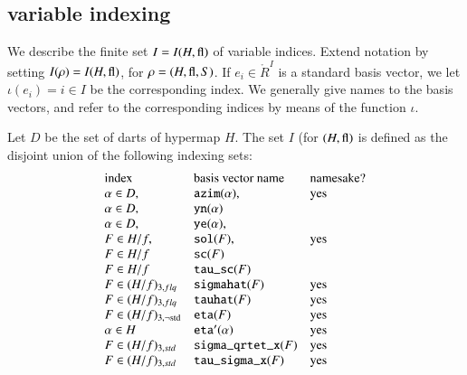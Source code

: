 \subsection{variable indexing}
\label{sec:var-index}

We describe the finite set $I = I(H,{\operatorname{fl}})$ of variable indices.
Extend notation by setting $I(\rho) = I(H,{\operatorname{fl}})$, for $\rho =
(H,{\operatorname{fl}},S)$.  If $e_i\in \ring{R}^I$ is a standard basis
vector, we let $\iota(e_i)=i\in I$ be the corresponding index.  We
generally give names to the basis vectors, and refer to the
corresponding indices by means of the function $\iota$.





\begin{definition}
Let $D$ be the set of darts of hypermap $H$.  The set $I$ (for
$(H,\op{fl})$ is defined as the disjoint union of the following
indexing sets:
    $$\begin{array}{llll}
        \text{index} &\text{basis vector name}&\text{namesake?}
        \\
        \alpha\in D, &\optt{azim}(\alpha), &\text{yes}
        \\
        \alpha\in D, &\optt{yn} (\alpha)
        \\
        \alpha\in D,
        &\optt{ye} (\alpha),
        \\
        F\in H/f,
        &\optt{sol} (F), &\text{yes}
        \\
        F\in H/f
        &\optt{sc} (F)
        \\
        F\in H/f
        &{\optt{tau\_sc}} (F)
        &\text{ }\\
        F\in (H/f)_{3,flq}
        &\optt{sigmahat} (F)
        &  \text{yes}\\
        F\in (H/f)_{3,flq}
        &\optt{tauhat} (F)
        &\text{yes}\\
        F\in (H/f)_{3,\neg\op{std}}
        &\optt{eta}(F)
        &\text{yes}\\
        \alpha\in H
        &\optt{eta}'(\alpha)
        &\text{yes}\\
        F\in (H/f)_{3,std}
        &\optt{sigma\_qrtet\_x} (F)
        &\text{yes} \\
        F\in (H/f)_{3,std}
        &\optt{tau\_sigma\_x} (F)
        &\text{yes} \\

\end{array}$$
\end{definition}
